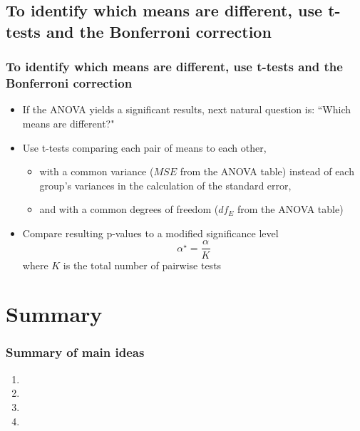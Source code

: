 \documentclass[slidestop,compress,mathserif,12pt,t,professionalfonts,xcolor=table]{beamer}
\begin{document}

\subsection{To identify which means are different, use t-tests and the Bonferroni correction}
\label{mi4}


\begin{frame}
\frametitle{To identify which means are different, use t-tests and the Bonferroni correction}

\begin{itemize}

\item If the ANOVA yields a significant results, next natural question is: ``Which means are different?"

\item Use t-tests comparing each pair of means to each other, 
\begin{itemize}
\item with a common variance ($MSE$ from the ANOVA table) instead of each group's variances in the 
calculation of the standard error,
\item and with a common degrees of freedom ($df_E$ from the ANOVA table)
\end{itemize}

\item Compare resulting p-values to a modified significance level
\[ \alpha^\star = \frac{\alpha}{K} \]
where $K$ is the total number of pairwise tests

\end{itemize}

\end{frame}


\begin{frame}

\vfill


\vfill

\end{frame}


\section{Summary}


\begin{frame}
\frametitle{Summary of main ideas}

\vfill

\begin{enumerate}

\item {}

\item {}

\item {}

\item {}

\end{enumerate}

\vfill

\end{frame}

\end{document}
